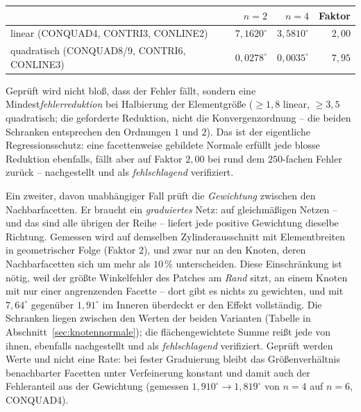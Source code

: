 \documentclass[a4paper,11pt]{article}
\begin{document}
\begin{itemize}
        \begin{center}
        \small
        \begin{tabular}{lrrr}
        \toprule
        & $n=2$ & $n=4$ & Faktor \\
        \midrule
        linear (CONQUAD4, CONTRI3, CONLINE2)      & $7{,}1620^\circ$ & $3{,}5810^\circ$ & $2{,}00$ \\
        quadratisch (CONQUAD8/9, CONTRI6, CONLINE3) & $0{,}0278^\circ$ & $0{,}0035^\circ$ & $7{,}95$ \\
        \bottomrule
        \end{tabular}
        \end{center}

        Geprüft wird nicht bloß, dass der Fehler fällt, sondern eine
        Mindest\emph{fehlerreduktion} bei Halbierung der Elementgröße ($\ge1{,}8$ linear,
        $\ge3{,}5$ quadratisch; die geforderte Reduktion, nicht die Konvergenzordnung -- die
        beiden Schranken entsprechen den Ordnungen $1$ und $2$). Das ist der eigentliche
        Regressionsschutz: eine facettenweise gebildete Normale erfüllt jede blosse Reduktion
        ebenfalls, fällt aber auf Faktor $2{,}00$ bei rund dem $250$-fachen Fehler zurück --
        nachgestellt und als \emph{fehlschlagend} verifiziert.

        Ein zweiter, davon unabhängiger Fall prüft die \emph{Gewichtung} zwischen den
        Nachbarfacetten. Er braucht ein \emph{graduiertes} Netz: auf gleichmäßigen Netzen -- und
        das sind alle übrigen der Reihe -- liefert jede positive Gewichtung dieselbe Richtung.
        Gemessen wird auf demselben Zylinderausschnitt mit Elementbreiten in geometrischer Folge
        (Faktor $2$), und zwar nur an den Knoten, deren Nachbarfacetten sich um mehr als $10\,\%$
        unterscheiden. Diese Einschränkung ist nötig, weil der größte Winkelfehler des Patches am
        \emph{Rand} sitzt, an einem Knoten mit nur einer angrenzenden Facette -- dort gibt es
        nichts zu gewichten, und mit $7{,}64^\circ$ gegenüber $1{,}91^\circ$ im Inneren überdeckt
        er den Effekt vollständig. Die Schranken liegen zwischen den Werten der beiden Varianten
        (Tabelle in Abschnitt~\ref{sec:knotennormale}); die flächengewichtete Summe reißt jede von
        ihnen, ebenfalls nachgestellt und als \emph{fehlschlagend} verifiziert. Geprüft werden
        Werte und nicht eine Rate: bei fester Graduierung bleibt das Größenverhältnis benachbarter
        Facetten unter Verfeinerung konstant und damit auch der Fehleranteil aus der Gewichtung
        (gemessen $1{,}910^\circ \to 1{,}819^\circ$ von $n=4$ auf $n=6$, CONQUAD4).


\end{itemize}
\end{document}
